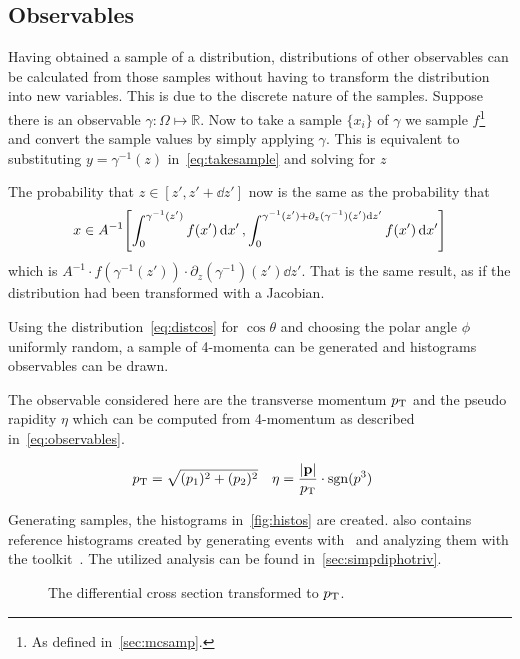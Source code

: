 \subsection{Observables}
\label{sec:obs}

Having obtained a sample of a distribution, distributions of other
observables can be calculated from those samples without having to
transform the distribution into new variables. This is due to the
discrete nature of the samples. Suppose there is an observable
\(\gamma\colon\Omega\mapsto\mathbb{R}\). Now to take a sample
\(\{x_i\}\) of \(\gamma\) we sample \(f\)\footnote{As defined
  in~\ref{sec:mcsamp}.} and convert the sample values by simply
applying \(\gamma\). This is equivalent to
substituting \(y=\gamma^{-1}(z)\) in~\eqref{eq:takesample} and solving
for \(z\)

The probability that \(z\in[z', z'+\dd{z'}]\) now is the same as the
probability that
\[\displaystyle x\in
  A^{-1}\qty[\int_{0}^{\gamma^{-1}(z')}f(x')\dd{x'},
  \int_{0}^{\gamma^{-1}(z')+\partial_z(\gamma^{-1})(z')\dd{z'}}f(x')\dd{x'}]\]
which is
\(A^{-1}\cdot f(\gamma^{-1}(z'))\cdot \partial_z(\gamma^{-1})(z')\dd{z'}\). That
is the same result, as if the distribution had been transformed with a
Jacobian.

Using the distribution~\eqref{eq:distcos} for \(\cos\theta\) and
choosing the polar angle \(\phi\) uniformly random, a sample of
4-momenta can be generated and histograms observables can be drawn.

The observable considered here are the transverse momentum \(p_\mathrm{T}\) and
the pseudo rapidity \(\eta\) which can be computed from 4-momentum as
described in~\eqref{eq:observables}.

\begin{align}
  \label{eq:observables}
  p_\mathrm{T} &= \sqrt{(p_1)^2+(p_2)^2} & \eta &=
                                         \frac{\abs{\vb{p}}}{p_\mathrm{T}}\cdot\operatorname{sgn}(p^3)
\end{align}

Generating  samples, the histograms
in~\ref{fig:histos} are created.  also contains
reference histograms created by generating events with \sherpa\ and
analyzing them with the \rivet toolkit~\cite{Bierlich:2019rhm}. The
utilized analysis can be found in~\ref{sec:simpdiphotriv}.

\begin{figure}[hb]
  \centering {}
  \caption{\label{fig:diff-xs-pt} The differential cross section
    transformed to \(p_\mathrm{T}\).}
\end{figure}

